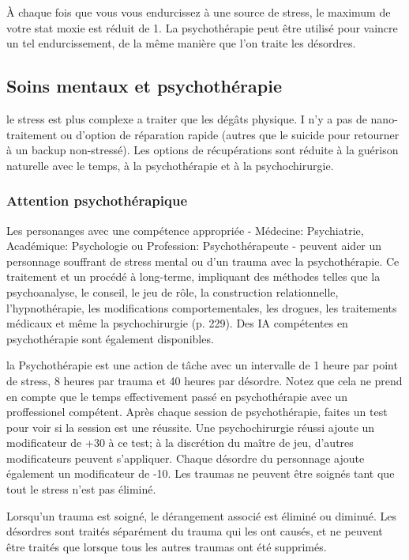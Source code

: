 À chaque fois que vous vous endurcissez à une source de stress, le maximum de votre stat moxie est réduit de 1. La psychothérapie peut être utilisé pour vaincre un tel endurcissement, de la même manière que l'on traite les désordres. 

\subsection{Soins mentaux et psychothérapie} \label{sec:mental-healing-psychotherapy} 

le stress est plus complexe a traiter que les dégâts physique. I n'y a pas de nano-traitement ou d'option de réparation rapide (autres que le suicide pour retourner à un backup non-stressé). Les options de récupérations sont réduite à la guérison naturelle avec le temps, à la psychothérapie et à la psychochirurgie. 

\subsubsection{Attention psychothérapique} 

Les personanges avec une compétence appropriée - Médecine: Psychiatrie, Académique: Psychologie ou Profession: Psychothérapeute - peuvent aider un personnage souffrant de stress mental ou d'un trauma avec la psychothérapie. Ce traitement et un procédé à long-terme, impliquant des méthodes telles que la psychoanalyse, le conseil, le jeu de rôle, la construction relationnelle, l'hypnothérapie, les modifications comportementales, les drogues, les traitements médicaux et même la psychochirurgie (p. 229). Des IA compétentes en psychothérapie sont également disponibles. 

la Psychothérapie est une action de tâche avec un intervalle de 1 heure par point de stress, 8 heures par trauma et 40 heures par désordre. Notez que cela ne prend en compte que le temps effectivement passé en psychothérapie avec un proffessionel compétent. Après chaque session de psychothérapie, faites un test pour voir si la session est une réussite. Une psychochirurgie réussi ajoute un modificateur de +30 à ce test; à la discrétion du maître de jeu, d'autres modificateurs peuvent s'appliquer. Chaque désordre du personnage ajoute également un modificateur de -10. Les traumas ne peuvent être soignés tant que tout le stress n'est pas éliminé. 

Lorsqu'un trauma est soigné, le dérangement associé est éliminé ou diminué. Les désordres sont traités séparément du trauma qui les ont causés, et ne peuvent être traités que lorsque tous les autres traumas ont été supprimés. 

